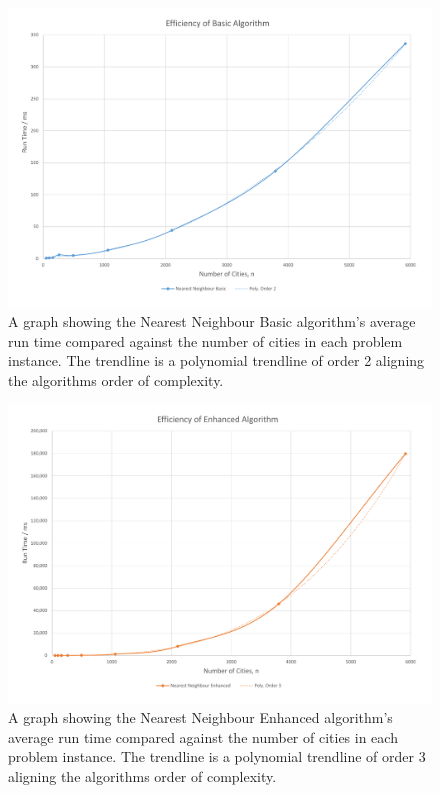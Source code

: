 \documentclass[conference,backref=page]{acmsiggraph}
\begin{document}
\begin{figure}[h]
	\includegraphics[width=\textwidth]{images/efficiency_basic.pdf}
	\caption{A graph showing the Nearest Neighbour Basic algorithm's average run time compared against the number of cities in each problem instance. The trendline is a polynomial trendline of order 2 aligning the algorithms order of complexity.}
	\label{efficiencybasicgraph}
\end{figure}


\begin{figure}[h]
	\includegraphics[width=\textwidth]{images/efficiency_enhanced.pdf}
	\caption{A graph showing the Nearest Neighbour Enhanced algorithm's average run time compared against the number of cities in each problem instance. The trendline is a polynomial trendline of order 3 aligning the algorithms order of complexity.}
	\label{efficiencyenhancedgraph}
\end{figure}
\end{document}
